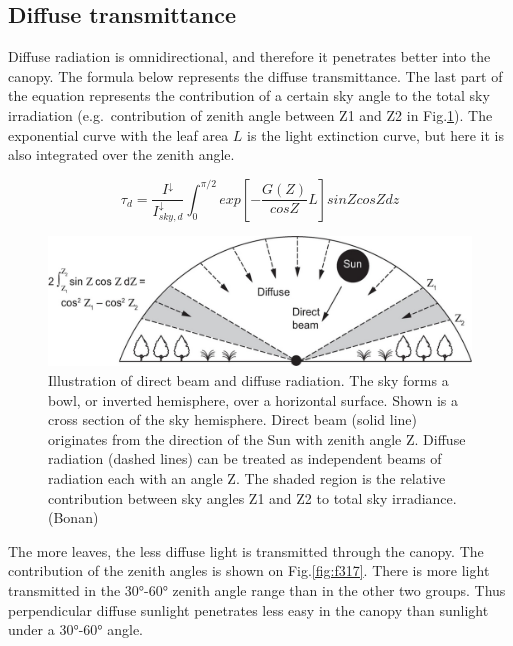 \documentclass[12pt,oneside]{book}
\begin{document}
\subsection{Diffuse transmittance}\label{diffuse-transmittance}

Diffuse radiation is omnidirectional, and therefore it penetrates better
into the canopy. The formula below represents the diffuse transmittance.
The last part of the equation represents the contribution of a certain
sky angle to the total sky irradiation (e.g.~contribution of zenith
angle between Z1 and Z2 in Fig.\ref{fig:f316}). The exponential curve
with the leaf area \(L\) is the light extinction curve, but here it is
also integrated over the zenith angle.

\[
\tau_d = \frac{I^{\downarrow}}{I^{\downarrow}_{sky,d}} \int_0^{\pi/2} exp\left[- \frac{G(Z)}{cosZ}L \right] sinZcosZdz
\]

\begin{figure}

{\centering \includegraphics[width=0.8\linewidth]{figures/chap3/f316_diffuse} 

}

\caption{Illustration of direct beam and diffuse radiation. The sky forms a bowl, or inverted hemisphere, over a horizontal surface. Shown is a cross section of the sky hemisphere. Direct beam (solid line) originates from the  direction of the Sun with zenith angle Ζ. Diffuse radiation (dashed lines) can be treated as independent beams of radiation each with an angle Ζ. The shaded region is the relative contribution between sky angles Ζ1 and Ζ2 to total sky irradiance.(Bonan)}\label{fig:f316}
\end{figure}

The more leaves, the less diffuse light is transmitted through the
canopy. The contribution of the zenith angles is shown on
Fig.\ref{fig:f317}. There is more light transmitted in the 30°-60°
zenith angle range than in the other two groups. Thus perpendicular
diffuse sunlight penetrates less easy in the canopy than sunlight under
a 30°-60° angle.
\end{document}
